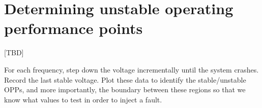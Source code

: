\section{Determining unstable operating performance points}

[TBD]

For each frequency, step down the voltage incrementally until the system
crashes. Record the last stable voltage. Plot these data to identify the
stable/unstable OPPs, and more importantly, the boundary between these regions
so that we know what values to test in order to inject a fault.
